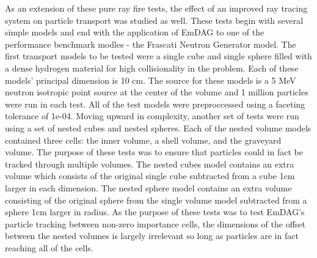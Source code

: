 \documentclass[10pt, a4paper]{article}
\begin{document}
As an extension of these pure ray fire tests, the effect of an improved ray tracing system on particle transport was studied as well. These tests begin with several simple models and end with the application of EmDAG to one of the performance benchmark modles - the Frascati Neutron Generator model. The first transport models to be tested were a single cube and single sphere filled with a dense hydrogen material for high collisionality in the problem. Each of these models' principal dimension is 10 cm. The source for these models is a 5 MeV neutron isotropic point source at the center of the volume and 1 million particles were run in each test. All of the test models were preproccessed using a faceting tolerance of 1e-04. Moving upward in complexity, another set of tests were run using a set of nested cubes and nested spheres. Each of the nested volume models contained three cells: the inner volume, a shell volume, and the graveyard volume. The purpose of these tests was to ensure that particles could in fact be tracked through multiple volumes. The nested cubes model contains an extra volume which consists of the original single cube subtracted from a cube 1cm larger in each dimension. The nested sphere model contains an extra volume consisting of the original sphere from the single volume model subtracted from a sphere 1cm larger in radius. As the purpose of these tests was to test EmDAG's particle tracking between non-zero importance cells, the dimensions of the offset between the nested volumes is largely irrelevant so long as particles are in fact reaching all of the cells.
\end{document}

